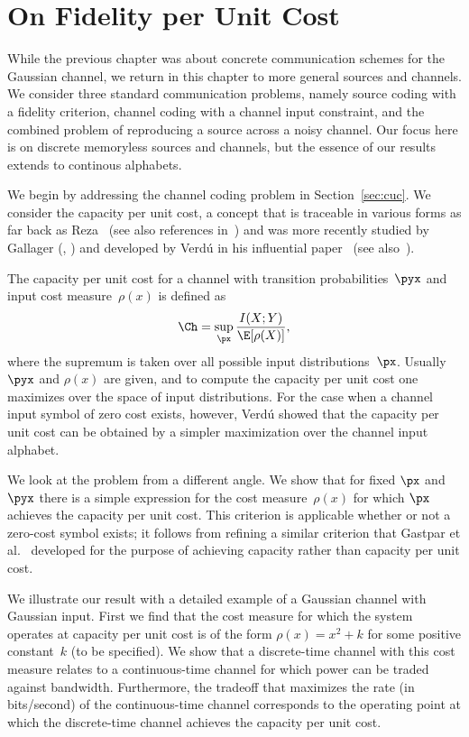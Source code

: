 \chapter{On Fidelity per Unit Cost}\label{ch:fidelity}

While the previous chapter was about concrete communication schemes for the
Gaussian channel, we return in this chapter to more general sources and
channels.  We consider three standard communication problems, namely source
coding with a fidelity criterion, channel coding  with a channel input
constraint, and the combined problem of reproducing a source across a noisy
channel. Our focus here is on discrete memoryless sources and channels, but the
essence of our results extends to continous alphabets. 

We begin by addressing the channel coding problem in Section~\ref{sec:cuc}. We
consider the capacity per unit cost, a concept that is traceable in various
forms as far back as Reza~\cite{Reza1961} (see also references
in~\cite{Verdu1990}) and was more recently studied by Gallager
(\cite{Gallager1988}, \cite[Ch.~14]{BlahutK2002}) and developed by Verd\'u in
his influential paper~\cite{Verdu1990} (see also~\cite{Verdu2002}).

The capacity per unit cost for a channel with transition probabilities~$\pyx$
and input cost measure~$\rho(x)$ is defined as \[ \Ch = \sup_{\px}
\frac{I(X;Y)}{\E[\rho(X)]}, \] where the supremum is taken over all possible
input distributions~$\px$.  Usually $\pyx$ and $\rho(x)$ are given, and to
compute the capacity per unit cost one maximizes over the space of input
distributions. For the case when a channel input symbol of zero cost exists,
however, Verd\'u showed that the capacity per unit cost can be obtained by a
simpler maximization over the channel input alphabet.

We look at the problem from a different angle. We show that for fixed $\px$ and
$\pyx$ there is a simple expression for the cost measure~$\rho(x)$ for which
$\px$ achieves the capacity per unit cost. This criterion is applicable whether
or not a zero-cost symbol exists; it follows from refining a similar criterion
that Gastpar et al.~\cite{GastparRV2003} developed for the purpose of achieving
capacity rather than capacity per unit cost.

We illustrate our result with a detailed example of a Gaussian channel with
Gaussian input.  First we find that the cost measure for which the system
operates at capacity per unit cost is of the form $\rho(x) = x^2 + k$ for some
positive constant~$k$ (to be specified). We show that a discrete-time channel
with this cost measure relates to a continuous-time channel for which power can
be traded against bandwidth.  Furthermore, the tradeoff that maximizes the rate
(in bits\slash second) of the continuous-time channel corresponds to the
operating point at which the discrete-time channel achieves the capacity per
unit cost.

